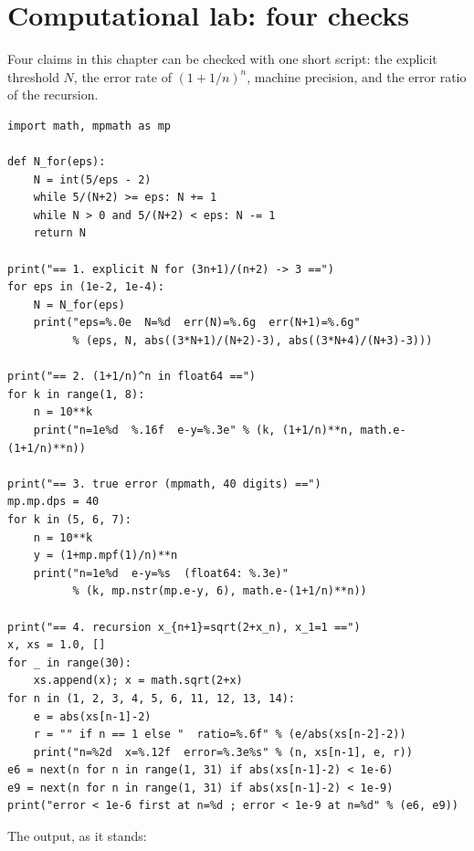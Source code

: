 \section{Computational lab: four checks}


Four claims in this chapter can be checked with one short script: the explicit threshold
$N$, the error rate of $(1+1/n)^n$, machine precision, and the error ratio of the
recursion.

\begin{lab}
\begin{verbatim}
import math, mpmath as mp

def N_for(eps):
    N = int(5/eps - 2)
    while 5/(N+2) >= eps: N += 1
    while N > 0 and 5/(N+2) < eps: N -= 1
    return N

print("== 1. explicit N for (3n+1)/(n+2) -> 3 ==")
for eps in (1e-2, 1e-4):
    N = N_for(eps)
    print("eps=%.0e  N=%d  err(N)=%.6g  err(N+1)=%.6g"
          % (eps, N, abs((3*N+1)/(N+2)-3), abs((3*N+4)/(N+3)-3)))

print("== 2. (1+1/n)^n in float64 ==")
for k in range(1, 8):
    n = 10**k
    print("n=1e%d  %.16f  e-y=%.3e" % (k, (1+1/n)**n, math.e-(1+1/n)**n))

print("== 3. true error (mpmath, 40 digits) ==")
mp.mp.dps = 40
for k in (5, 6, 7):
    n = 10**k
    y = (1+mp.mpf(1)/n)**n
    print("n=1e%d  e-y=%s  (float64: %.3e)"
          % (k, mp.nstr(mp.e-y, 6), math.e-(1+1/n)**n))

print("== 4. recursion x_{n+1}=sqrt(2+x_n), x_1=1 ==")
x, xs = 1.0, []
for _ in range(30):
    xs.append(x); x = math.sqrt(2+x)
for n in (1, 2, 3, 4, 5, 6, 11, 12, 13, 14):
    e = abs(xs[n-1]-2)
    r = "" if n == 1 else "  ratio=%.6f" % (e/abs(xs[n-2]-2))
    print("n=%2d  x=%.12f  error=%.3e%s" % (n, xs[n-1], e, r))
e6 = next(n for n in range(1, 31) if abs(xs[n-1]-2) < 1e-6)
e9 = next(n for n in range(1, 31) if abs(xs[n-1]-2) < 1e-9)
print("error < 1e-6 first at n=%d ; error < 1e-9 at n=%d" % (e6, e9))
\end{verbatim}
\end{lab}

\newpage
The output, as it stands:

